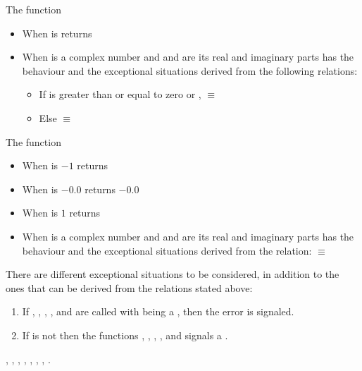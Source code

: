 \documentclass[../Exponentials-Logarithms-Trigonometry.tex]{subfiles}
\begin{document}
\noindent
The function 
\begin{itemize}
\item When  is  returns
\item When  is a complex number and   and 
  are its real and imaginary parts has the behaviour and the exceptional
  situations derived from the following relations:
  \begin{itemize}
  \item If  is greater than or equal to zero or
    , \code{)}
    $\equiv$ \code{
    }\code{)))}
  \item Else  \code{)}
    $\equiv$ \code{
    }\code{))))}
  \end{itemize}
\end{itemize}

\noindent
The function 
\begin{itemize}
\item When  is $-1$ returns 
\item When  is $-0.0$ returns $-0.0$
\item When  is $1$ returns 
\item When  is a complex number and   and 
  are its real and imaginary parts has the behaviour and the exceptional
  situations derived from the relation: \code{)}
  $\equiv$ \code{ (-
  }\code{)))}
\end{itemize}

\DExceptional{}

There are different exceptional situations to be considered, in addition to
the ones that can be derived from the relations stated above:
\begin{enumerate}
\item If , , , ,
   and  are called with
   being a , then the
   error is signaled.
\item If  is not \CL{}
   then the functions , , ,
  ,  and  signals a
  .
\end{enumerate}

\DSeeAlso{}

\code{*}, \code{-}, , , , ,
, .
\end{document}
